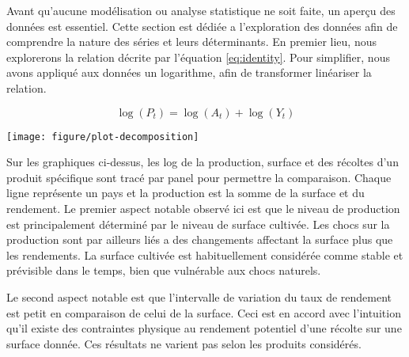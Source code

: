 \documentclass[nojss]{jss}\usepackage{graphicx, color}
\newenvironment{knitrout}{}{} %
\begin{document}
Avant qu'aucune mod\'{e}lisation ou analyse statistique ne soit faite,
un aper\c{c}u des donn\'{e}es est essentiel. Cette section est
d\'{e}di\'{e}e a l'exploration des donn\'{e}es afin de comprendre la
nature des s\'{e}ries et leurs d\'{e}terminants. En premier lieu, nous
explorerons la relation d\'{e}crite par l'\'{e}quation
\ref{eq:identity}. Pour simplifier, nous avons appliqu\'{e} aux
donn\'{e}es un logarithme, afin de transformer lin\'{e}ariser la
relation.

\begin{equation}
  \label{eq:logIdentity}
  \log(P_t) = \log(A_t) + \log(Y_t)
\end{equation}



















\begin{knitrout}
\color{fgcolor}

{\centering \texttt{[image: figure/plot-decomposition]} 

}



\end{knitrout}



Sur les graphiques ci-dessus, les log de la production, surface et des
r\'{e}coltes d'un produit sp\'{e}cifique sont trac\'{e} par panel pour
permettre la comparaison. Chaque ligne repr\'{e}sente un pays et la
production est la somme de la surface et du rendement. Le premier
aspect notable observ\'{e} ici est que le niveau de production est
principalement d\'{e}termin\'{e} par le niveau de surface
cultiv\'{e}e. Les chocs sur la production sont par ailleurs li\'{e}s a
des changements affectant la surface plus que les rendements. La
surface cultiv\'{e}e est habituellement consid\'{e}r\'{e}e comme
stable et pr\'{e}visible dans le temps, bien que vuln\'{e}rable aux
chocs naturels.


Le second aspect notable est que l'intervalle de variation du taux de
rendement est petit en comparaison de celui de la surface. Ceci est en
accord avec l'intuition qu'il existe des contraintes physique au
rendement potentiel d'une r\'{e}colte sur une surface donn\'{e}e. Ces
r\'{e}sultats ne varient pas selon les produits consid\'{e}r\'{e}s.
\end{document}
